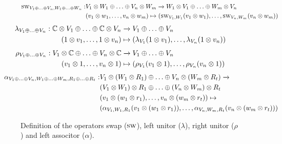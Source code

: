 \begin{figure}[H]
  \begin{equation*}
    \begin{split}
    \textsc{sw}_{V_1 \oplus \ldots \oplus V_n, W_1 \oplus \ldots \oplus W_n} :  &V_{1}\otimes W_{1} \oplus \ldots \oplus  V_{n}\otimes W_{m} \xrightarrow{} W_1 \otimes V_1 \oplus \ldots \oplus W_m \otimes V_n  \\
    &(v_{1}\otimes w_{1},\ldots,v_{n}\otimes w_{m}) \mapsto (\textsc{sw}_{V_1,W_1} (v_{1}\otimes w_{1}), \ldots, \textsc{sw}_{V_n,W_m}(v_n\otimes w_{m}) ) 
  \end{split}
  \end{equation*}
  \begin{equation*}
    \begin{split}
   \hspace{-25pt} \lambda_{ V_{1} \oplus \ldots \oplus V_{n}} :  \mathbb{C}\otimes V_{1} \oplus \ldots \oplus  \mathbb{C} \otimes V_{n} &\xrightarrow{} V_1 \oplus \ldots \oplus V_n  \\
    (1\otimes v_{1},\ldots,1\otimes v_{n}) &\mapsto (\lambda_{V_1} (1 \otimes v_{1}), \ldots, \lambda_{V_n}(1 \otimes v_{n}) ) 
  \end{split}
  \end{equation*}
  \begin{equation*}
    \begin{split}
      \hspace{-25pt} \rho_{ V_{1} \oplus \ldots \oplus V_{n}} :  V_{1} \otimes \mathbb{C} \oplus \ldots \oplus V_{n} \otimes \mathbb{C} &\xrightarrow{} V_1 \oplus \ldots \oplus V_n  \\
    ( v_{1} \otimes 1,\ldots, v_{n} \otimes 1) &\mapsto (\rho_{V_1} ( v_{1} \otimes 1), \ldots, \rho_{V_n}( v_{n} \otimes 1) ) 
  \end{split}
  \end{equation*}
  \begin{equation*}
    \begin{split}
      \hspace{-25pt}\alpha_{V_1 \oplus \ldots \oplus V_n, W_1 \oplus \ldots \oplus W_m, R_1 \oplus \ldots \oplus R_t } :  &V_{1} \otimes (W_1 \otimes R_1) \oplus \ldots \oplus V_{n} \otimes (W_m \otimes R_t) \xrightarrow{} \\
     &(V_{1} \otimes W_1) \otimes R_1 \oplus \ldots \oplus  (V_{n} \otimes W_m) \otimes R_t  \\
    &( v_{1} \otimes (w_1 \otimes r_1),\ldots, v_{n} \otimes (w_m \otimes r_t)) \mapsto \\
    &(\alpha_{V_1, W_1, R_1} ( v_{1} \otimes (w_1 \otimes r_1)), \ldots, \alpha_{V_{n}, W_m, R_t}( v_{n} \otimes (w_{m} \otimes r_t)) ) 
  \end{split}
  \end{equation*} 
  \caption{Definition of the operators swap ($\textsc{sw}$), left unitor  ($\lambda$), right unitor ($\rho$) and left associtor ($\alpha$).}
\label{fig:define_ops_direct_sum} 
\end{figure}



